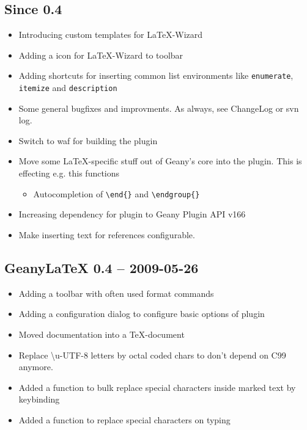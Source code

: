 \documentclass[%
a4paper,%
10pt,%
oneside,%
DIV18,
headsepline,
plainheadsepline,
footsepline,
plainfootsepline,
bibtotoc,%
liststotoc,%
BCOR12mm,%
halfparskip,%
openany,%
]{scrartcl}
\begin{document}
\subsection*{Since 0.4}
\begin{itemize}

	\item Introducing custom templates for \LaTeX-Wizard
	\item Adding a icon for \LaTeX-Wizard to toolbar
	\item Adding shortcuts for inserting common list environments
		  like \texttt{enumerate}, \texttt{itemize} and
		  \texttt{description}
	\item Some general bugfixes and improvments. As always, see
		  ChangeLog or svn log.
	\item Switch to waf for building the plugin
	\item Move some \LaTeX{}-specific stuff out of Geany's core into the
		  plugin. This is effecting e.g. this functions
			\begin{itemize}
				\item Autocompletion of \texttt{\textbackslash{}end\{\}}
					and \texttt{\textbackslash{}endgroup\{\}}
			\end{itemize}
	\item Increasing dependency for plugin to Geany Plugin API v166
	\item Make inserting text for references configurable.
\end{itemize}

\subsection*{GeanyLaTeX{} 0.4 -- 2009-05-26}
\begin{itemize}
	\item Adding a toolbar with often used format commands
	\item Adding a configuration dialog to configure basic options
          of plugin
	\item Moved documentation into a \TeX{}-document
	\item Replace \textbackslash{}u-UTF-8 letters by octal coded
          chars to don't depend on C99 anymore.
	\item Added a function to bulk replace special characters
          inside marked text by keybinding
	\item Added a function to replace special characters on typing
\end{itemize}
\end{document}
